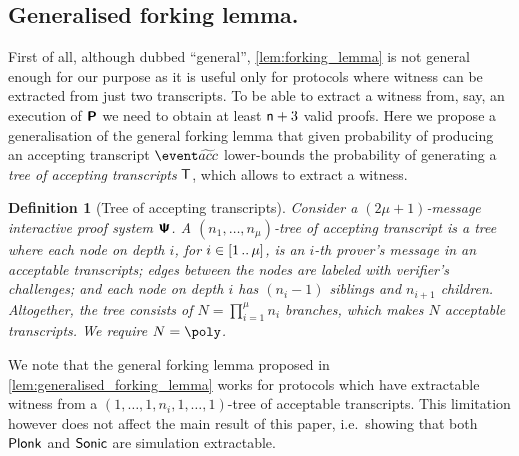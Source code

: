\let\accentvec\vec \documentclass[runningheads]{llncs}
\newtheorem{definition}[theorem]{Definition}
\begin{document}
\subsection{Generalised forking lemma.}
First of all, although dubbed ``general'', \cref{lem:forking_lemma} is not
general enough for our purpose as it is useful only for protocols where witness
can be extracted from just two transcripts.  To be able to extract a witness
from, say, an execution of $\bm{\mathsf{P}}$ we need to obtain at least
$\mathsf{n} + 3$ valid proofs.  
Here we propose a generalisation of the general forking lemma that given
probability of producing an accepting transcript $\waccProb$ lower-bounds the
probability of generating a \emph{tree of accepting transcripts} $\mathsf{T}$,
which allows to extract a witness. 

\begin{definition}[Tree of accepting transcripts]
	\label{def:tree_of_accepting_transcripts}
	Consider a $(2\mu + 1)$-message interactive proof system $\bm{\mathsf{\Psi}}$. A $(n_1,
	\ldots, n_\mu)$-tree of accepting transcript is a tree where each node on
	depth $i$, for $i \in [1 \, .. \, \mu]$, is an $i$-th prover's message in an
	acceptable transcripts; edges between the nodes are labeled with verifier's
	challenges; and each node on depth $i$ has $(n_{i} - 1)$ siblings and $n_{i + 1}$ children.
	Altogether, the tree consists of $N = \prod_{i = 1}^\mu n_i$ branches, which
	makes $N$ acceptable transcripts. We require $N = \poly$.
\end{definition}

We note that the general forking lemma proposed in
\cref{lem:generalised_forking_lemma} works for protocols which have
extractable witness from a $(1, \ldots, 1, n_i, 1, \ldots, 1)$-tree of
acceptable transcripts. This limitation however does not affect the main
result of this paper, i.e.~showing that both $\textnormal{\textsf{Plonk}}$ and ${\textnormal{\textsf{Sonic}}}$ are
simulation extractable. 
\end{document}

